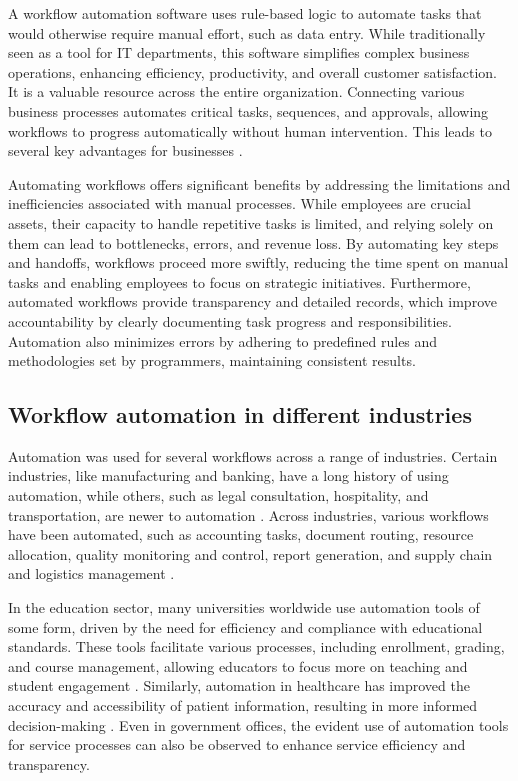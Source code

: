 A workflow automation software uses rule-based logic to automate tasks that would otherwise require manual effort, such as data entry. While traditionally seen as a tool for IT departments, this software simplifies complex business operations, enhancing efficiency, productivity, and overall customer satisfaction. It is a valuable resource across the entire organization. Connecting various business processes automates critical tasks, sequences, and approvals, allowing workflows to progress automatically without human intervention. This leads to several key advantages for businesses \cite{servicenow}.

Automating workflows offers significant benefits by addressing the limitations and inefficiencies associated with manual processes. While employees are crucial assets, their capacity to handle repetitive tasks is limited, and relying solely on them can lead to bottlenecks, errors, and revenue loss. By automating key steps and handoffs, workflows proceed more swiftly, reducing the time spent on manual tasks and enabling employees to focus on strategic initiatives. Furthermore, automated workflows provide transparency and detailed records, which improve accountability by clearly documenting task progress and responsibilities. Automation also minimizes errors by adhering to predefined rules and methodologies set by programmers, maintaining consistent results.

\subsection{Workflow automation in different industries}

Automation was used for several workflows across a range of industries. Certain industries, like manufacturing and banking, have a long history of using automation, while others, such as legal consultation, hospitality, and transportation, are newer to automation \cite{caban2021}. Across industries, various workflows have been automated, such as accounting tasks, document routing, resource allocation, quality monitoring and control, report generation, and supply chain and logistics management \cite{aguirre2017, mcquilken2014}.

In the education sector, many universities worldwide use automation tools of some form, driven by the need for efficiency and compliance with educational standards. These tools facilitate various processes, including enrollment, grading, and course management, allowing educators to focus more on teaching and student engagement \cite{choudhary2024}. Similarly, automation in healthcare has improved the accuracy and accessibility of patient information, resulting in more informed decision-making \cite{gupta2020}. Even in government offices, the evident use of automation tools for service processes can also be observed to enhance service efficiency and transparency. 

